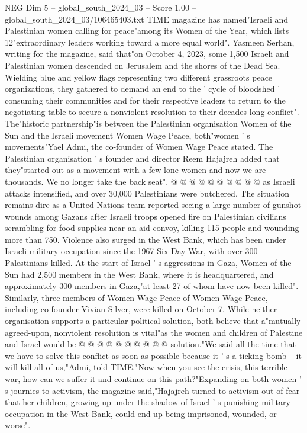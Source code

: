 \begin{textsample}{NEG Dim 5 – global\_south\_2024\_03 – Score 1.00 – global\_south\_2024\_03/106465403.txt}  \label{ex:f5_neg_210}
TIME magazine has named"Israeli and Palestinian women calling for peace"among its Women of the Year, which lists 12"extraordinary leaders working toward a more equal world".
Yasmeen Serhan, writing for the magazine, said that"on October 4, 2023, some 1,500 Israeli and Palestinian women descended on Jerusalem and the shores of the Dead Sea.
Wielding blue and yellow flags representing two different grassroots peace organizations, they gathered to demand an end to the ' cycle of bloodshed ' consuming their communities and for their respective leaders to return to the negotiating table to secure a nonviolent resolution to their decades-long conflict".
The"historic partnership"is between the Palestinian organisation Women of the Sun and the Israeli movement Women Wage Peace, both"women ' s movements"Yael Admi, the co-founder of Women Wage Peace stated.
The Palestinian organisation ' s founder and director Reem Hajajreh added that they"started out as a movement with a few lone women and now we are thousands.
We no longer take the back seat". @ @ @ @ @ @ @ @ @ @ as Israeli attacks intensified, and over 30,000 Palestinians were butchered.
The situation remains dire as a United Nations team reported seeing a large number of gunshot wounds among Gazans after Israeli troops opened fire on Palestinian civilians scrambling for food supplies near an aid convoy, killing 115 people and wounding more than 750.
Violence also surged in the West Bank, which has been under Israeli military occupation since the 1967 Six-Day War, with over 300 Palestinians killed.
At the start of Israel ' s aggressions in Gaza, Women of the Sun had 2,500 members in the West Bank, where it is headquartered, and approximately 300 members in Gaza,"at least 27 of whom have now been killed".
Similarly, three members of Women Wage Peace of Women Wage Peace, including co-founder Vivian Silver, were killed on October 7.
While neither organisation supports a particular political solution, both believe that a"mutually agreed-upon, nonviolent resolution is vital"as the women and children of Palestine and Israel would be @ @ @ @ @ @ @ @ @ @ solution."We said all the time that we have to solve this conflict as soon as possible because it ' s a ticking bomb -- it will kill all of us,"Admi, told TIME."Now when you see the crisis, this terrible war, how can we suffer it and continue on this path?"Expanding on both women ' s journies to activism, the magazine said,"Hajajreh turned to activism out of fear that her children, growing up under the shadow of Israel ' s punishing military occupation in the West Bank, could end up being imprisoned, wounded, or worse".

\end{textsample}
